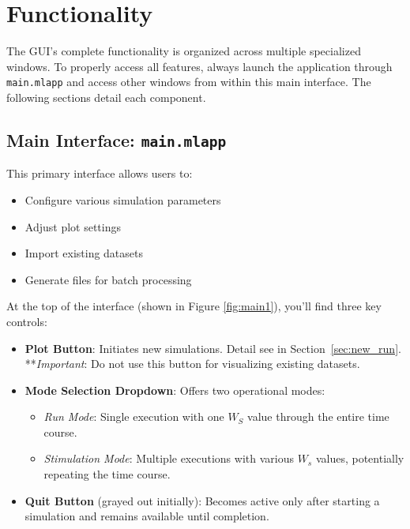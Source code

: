 \chapter{Functionality}\label{ch:functionality}

The GUI's complete functionality is organized across multiple specialized windows. To properly access all features, always launch the application through \texttt{main.mlapp} and access other windows from within this main interface. The following sections detail each component.

\section{Main Interface: \texttt{main.mlapp}}

This primary interface allows users to:
\begin{itemize}
    \item Configure various simulation parameters
    \item Adjust plot settings
    \item Import existing datasets
    \item Generate files for batch processing
\end{itemize}

At the top of the interface (shown in Figure \ref{fig:main1}), you'll find three key controls:

\begin{itemize}
    \item \textbf{Plot Button}: Initiates new simulations. Detail see in Section~\ref{sec:new_run}. **\textit{Important}: Do not use this button for visualizing existing datasets.
    
    \item \textbf{Mode Selection Dropdown}: Offers two operational modes:
    \begin{itemize}
        \item \textit{Run Mode}: Single execution with one $W_S$ value through the entire time course.
        \item \textit{Stimulation Mode}: Multiple executions with various $W_s$ values, potentially repeating the time course.
    \end{itemize}
    
    \item \textbf{Quit Button} (grayed out initially): Becomes active only after starting a simulation and remains available until completion.
\end{itemize}

